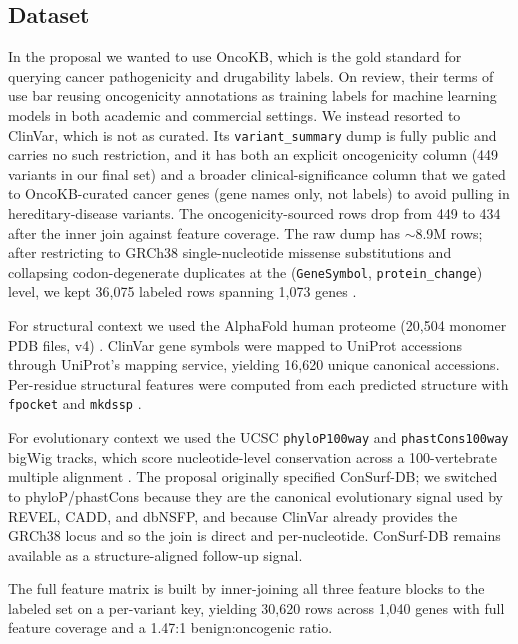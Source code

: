 \documentclass{article}
\begin{document}
\subsection{Dataset}
In the proposal we wanted to use OncoKB, which is the gold standard
for querying cancer pathogenicity and drugability labels. On review, their terms
of use bar reusing oncogenicity annotations as training labels for
machine learning models in both academic and commercial settings. We
instead resorted to ClinVar, which is not as curated. Its
\texttt{variant\_summary} dump is fully public and carries no such
restriction, and it has both an explicit oncogenicity column (449
variants in our final set) and a broader clinical-significance column
that we gated to OncoKB-curated cancer genes (gene names only, not
labels) to avoid pulling in hereditary-disease variants. The
oncogenicity-sourced rows drop from 449 to 434 after the inner join
against feature coverage. The raw dump has $\sim$8.9M rows; after
restricting to GRCh38 single-nucleotide missense substitutions and
collapsing codon-degenerate duplicates at the (\texttt{GeneSymbol},
\texttt{protein\_change}) level, we kept 36{,}075 labeled rows
spanning 1{,}073 genes \citep{landrum2018clinvar}.

For structural context we used the AlphaFold human proteome
(20{,}504 monomer PDB files, v4) \citep{jumper2021alphafold,
varadi2022alphafolddb}. ClinVar gene symbols were mapped to UniProt
accessions through UniProt's mapping service, yielding 16{,}620 unique
canonical accessions. Per-residue structural features were computed from
each predicted structure with \texttt{fpocket}
\citep{leguilloux2009fpocket} and \texttt{mkdssp}
\citep{kabsch1983dssp}.

For evolutionary context we used the UCSC \texttt{phyloP100way} and
\texttt{phastCons100way} bigWig tracks, which score nucleotide-level
conservation across a 100-vertebrate multiple alignment
\citep{pollard2010phylop, siepel2005phastcons}. The proposal originally
specified ConSurf-DB; we switched to phyloP/phastCons because they are
the canonical evolutionary signal used by REVEL, CADD, and dbNSFP, and
because ClinVar already provides the GRCh38 locus and so the join is direct
and per-nucleotide. ConSurf-DB remains available as a structure-aligned
follow-up signal.

The full feature matrix is built by inner-joining all three feature
blocks to the labeled set on a per-variant key, yielding 30{,}620 rows
across 1{,}040 genes with full feature coverage and a 1.47:1
benign:oncogenic ratio.
\end{document}
